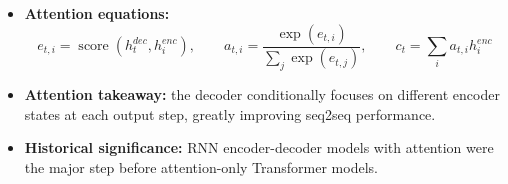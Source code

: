 \documentclass[11pt]{article}
\begin{document}
\begin{itemize}
    \item \textbf{Attention equations:}
    \[
    e_{t,i} = \operatorname{score}(h^{dec}_t, h^{enc}_i), \qquad
    a_{t,i} = \frac{\exp(e_{t,i})}{\sum_j \exp(e_{t,j})}, \qquad
    c_t = \sum_i a_{t,i} h^{enc}_i
    \]
    \item \textbf{Attention takeaway:} the decoder conditionally focuses on different encoder states at each output step, greatly improving seq2seq performance.
    \item \textbf{Historical significance:} RNN encoder-decoder models with attention were the major step before attention-only Transformer models.
\end{itemize}
\end{document}
